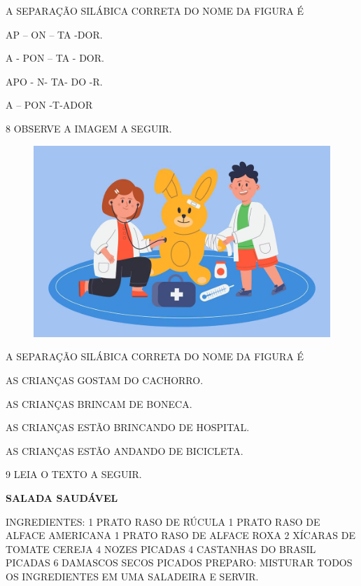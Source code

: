 A SEPARAÇÃO SILÁBICA CORRETA DO NOME DA FIGURA É

\begin{escolha}

\item AP – ON – TA -DOR.

\item A - PON – TA - DOR.

\item APO - N- TA- DO -R.

\item A – PON -T-ADOR

\end{escolha}

\pagebreak
\num{8} OBSERVE A IMAGEM A SEGUIR.

\begin{figure}[H]
\centering
\includegraphics[width=.7\textwidth]{./media/image234.png}
\end{figure}

A SEPARAÇÃO SILÁBICA CORRETA DO NOME DA FIGURA É

\begin{escolha}

\item AS CRIANÇAS GOSTAM DO CACHORRO.

\item AS CRIANÇAS BRINCAM DE BONECA.

\item AS CRIANÇAS ESTÃO BRINCANDO DE HOSPITAL.

\item AS CRIANÇAS ESTÃO ANDANDO DE BICICLETA.

\end{escolha}

\num{9} LEIA O TEXTO A SEGUIR.

\begin{myquote}
\textbf{SALADA SAUDÁVEL}

INGREDIENTES:
1 PRATO RASO DE RÚCULA
1 PRATO RASO DE ALFACE AMERICANA 
1 PRATO RASO DE ALFACE ROXA
2 XÍCARAS DE TOMATE CEREJA
4 NOZES PICADAS
4 CASTANHAS DO BRASIL PICADAS 
6 DAMASCOS SECOS PICADOS
PREPARO:
MISTURAR TODOS OS INGREDIENTES EM UMA SALADEIRA E SERVIR.

\end{myquote}

